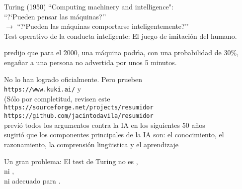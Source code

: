 \documentclass[10pt]{article}
\begin{document}
\begin{huge}

Turing (1950) ``Computing machinery and intelligence":\\

\blob ``?`Pueden pensar las m{\'a}quinas?''\\
 $\longrightarrow$ ``?`Pueden las m{\'a}quinas comportarse inteligentemente?''\\

\blob Test operativo de la conducta inteligente: El juego de
imitaci{\'o}n del humano.

\vspace*{0.2in}

\textwidth
{}

\blob predijo que para el 2000, una m{\'a}quina podr{\'\i}a, con
una probabilidad de 30\%, enga{\~n}ar a una persona no advertida
por unos 5 minutos.


No lo han logrado oficialmente. Pero prueben\\
\verb|https://www.kuki.ai/| y\\

\blob (S{\'o}lo por completitud, revisen este\\
\verb|https://sourceforge.net/projects/resumidor|\\
\verb|https://github.com/jacintodavila/resumidor|\\

\blob previ{\'o} todos los argumentos contra la IA en los siguientes 50 a{\~n}os\\

\blob sugiri{\'o} que los componentes principales de la IA son: el
conocimiento, el razonamiento, la comprensi{\'o}n ling{\"u}istica
y el aprendizaje\\


Un gran problema: El test de Turing no es ,\\
ni , \\
ni adecuado para .\\


\end{huge}
\end{document}
